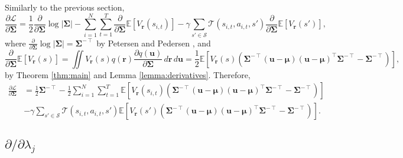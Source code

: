 \documentclass{article}
\theoremstyle{definition}
\theoremstyle{remark}
\newcommand{\V}{V_{\mathbf{r}}}
\newcommand{\dS}{\frac{\partial}{\partial\bm\Sigma}}
\newcommand{\dx}{\,d\mathbf{r}\,d\mathbf{u}}
\begin{document}
Similarly to the previous section,
\[
  \frac{\partial\mathcal{L}}{\partial\bm\Sigma} = \frac{1}{2}\dS\log|\bm\Sigma|
  - \sum_{i=1}^N \sum_{t=1}^T \dS\mathbb{E}[\V(s_{i,t})] -
  \gamma\sum_{s' \in \mathcal{S}} \mathcal{T}(s_{i,t}, a_{i,t},
  s')\dS\mathbb{E}[\V(s')],
\]
where $\dS\log|\bm\Sigma| = \bm\Sigma^{-\intercal}$ by Petersen and Pedersen
\cite{petersen2008matrix}, and
\[
  \dS\mathbb{E}[\V(s)] = \iint \V(s) q(\mathbf{r})
  \frac{\partial q(\mathbf{u})}{\partial \bm\Sigma}\dx =
  \frac{1}{2}\mathbb{E}[\V(s)(\bm\Sigma^{-\intercal}(\mathbf{u} -
  \bm\mu)(\mathbf{u} - \bm\mu)^\intercal\bm\Sigma^{-\intercal} -
  \bm\Sigma^{-\intercal})],
\]
by Theorem \ref{thm:main} and Lemma \ref{lemma:derivatives}. Therefore,
\[
  \begin{split}
    \frac{\partial\mathcal{L}}{\partial\bm\Sigma} &=
    \frac{1}{2}\bm\Sigma^{-\intercal} - \frac{1}{2} \sum_{i=1}^N\sum_{t=1}^T
    \mathbb{E}[\V(s_{i,t})(\bm\Sigma^{-\intercal}(\mathbf{u} -
    \bm\mu)(\mathbf{u} - \bm\mu)^\intercal\bm\Sigma^{-\intercal} -
    \bm\Sigma^{-\intercal})] \\
    &- \gamma\sum_{s' \in \mathcal{S}}\mathcal{T}(s_{i,t}, a_{i,t}, s')
    \mathbb{E}[\V(s')(\bm\Sigma^{-\intercal}(\mathbf{u} -
    \bm\mu)(\mathbf{u} - \bm\mu)^\intercal\bm\Sigma^{-\intercal} -
    \bm\Sigma^{-\intercal})].
  \end{split}
\]

\subsection{$\partial/\partial \lambda_j$}
\end{document}
